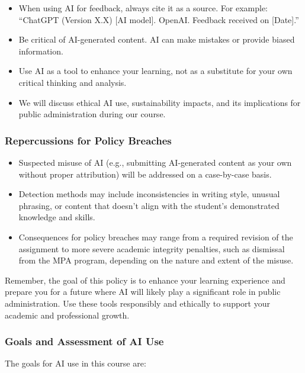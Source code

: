 \documentclass[11pt, letterpaper]{article}
\begin{document}
\begin{itemize}
    \item When using AI for feedback, always cite it as a source. For example: ``ChatGPT (Version X.X) [AI model]. OpenAI. Feedback received on [Date].''
    \item Be critical of AI-generated content. AI can make mistakes or provide biased information.
    \item Use AI as a tool to enhance your learning, not as a substitute for your own critical thinking and analysis.
    \item We will discuss ethical AI use, sustainability impacts, and its implications for public administration during our course.
\end{itemize}

\subsubsection*{Repercussions for Policy Breaches}

\begin{itemize}
    \item Suspected misuse of AI (e.g., submitting AI-generated content as your own without proper attribution) will be addressed on a case-by-case basis.
    \item Detection methods may include inconsistencies in writing style, unusual phrasing, or content that doesn't align with the student's demonstrated knowledge and skills.
    \item Consequences for policy breaches may range from a required revision of the assignment to more severe academic integrity penalties, such as dismissal from the MPA program, depending on the nature and extent of the misuse.
\end{itemize}

\noindent Remember, the goal of this policy is to enhance your learning experience and prepare you for a future where AI will likely play a significant role in public administration. Use these tools responsibly and ethically to support your academic and professional growth.

\subsubsection*{Goals and Assessment of AI Use}

\noindent The goals for AI use in this course are:
\end{document}

